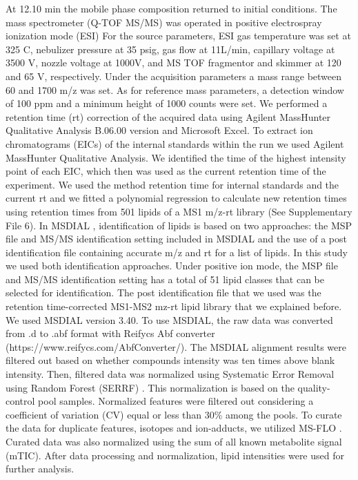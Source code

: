 \documentclass[9pt,twocolumn,twoside,lineno]{BioRxiv}
\begin{document}
At 12.10 min the mobile phase composition returned to initial conditions.
The mass spectrometer (Q-TOF MS/MS) was operated in positive electrospray ionization mode (ESI)
For the source parameters, ESI gas temperature was set at 325 \degree C, nebulizer pressure at 35 psig, gas flow at 11L/min, capillary voltage at 3500 V, nozzle voltage at 1000V, and MS TOF fragmentor and skimmer at 120 and 65 V, respectively.
Under the acquisition parameters a mass range between 60 and 1700 m/z was set. 
As for reference mass parameters, a detection window of 100 ppm and a minimum height of 1000 counts were set. 
We performed a retention time (rt) correction of the acquired data using Agilent MassHunter Qualitative Analysis B.06.00 version and Microsoft Excel. 
To extract ion chromatograms (EICs) of the internal standards within the run we used Agilent MassHunter Qualitative Analysis.
We identified the time of the highest intensity point of each EIC, which then was used as the current retention time of the experiment. 
We used the method retention time for internal standards and the current rt and we fitted a polynomial regression to calculate new retention times using retention times from 501 lipids of a MS1 m/z-rt library (See Supplementary File 6). 
In MSDIAL \cite{Tsugawa2015-kh}, identification of lipids is based on two approaches: the MSP file and MS/MS identification setting included in MSDIAL and the use of a post identification file containing accurate m/z and rt for a list of lipids. 
In this study we used both identification approaches. 
Under positive ion mode, the MSP file and MS/MS identification setting has a total of 51 lipid classes  that can be selected for identification. 
The post identification file that we used was the retention time-corrected MS1-MS2 mz-rt lipid library that we explained before. 
We used MSDIAL \cite{Tsugawa2015-kh} version 3.40. 
To use MSDIAL, the raw data was converted from .d to .abf format with Reifycs Abf converter (https://www.reifycs.com/AbfConverter/). 
The MSDIAL alignment results were filtered out based on whether compounds intensity was ten times above blank intensity. 
Then, filtered data was normalized using Systematic Error Removal using Random Forest (SERRF) \cite{Fan2019}.
This normalization is based on the quality-control pool samples. 
Normalized features were filtered out considering a coefficient of variation (CV) equal or less than 30\% among the pools. 
To curate the data for duplicate features, isotopes and ion-adducts, we utilized MS-FLO \cite{DeFelice2017-ms}.
Curated data was also normalized using the sum of all known metabolite signal (mTIC). 
After data processing and normalization, lipid intensities were used for further analysis.
\end{document}
